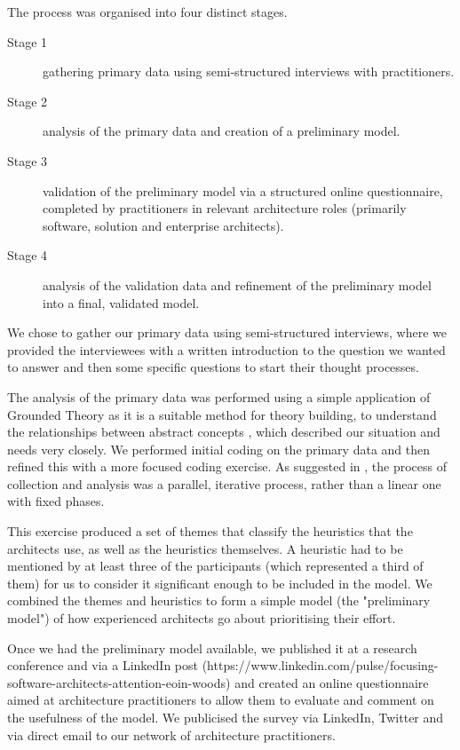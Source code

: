 The process was organised into four distinct stages.

\begin{description}
	\item [Stage 1] gathering primary data using semi-structured interviews with practitioners.
	\item [Stage 2] analysis of the primary data and creation of a preliminary model.
	\item [Stage 3] validation of the preliminary model via a structured online questionnaire, completed by practitioners in relevant architecture roles (primarily software, solution and enterprise architects).
	\item [Stage 4] analysis of the validation data and refinement of the preliminary model into a final, validated model.
\end{description}

We chose to gather our primary data using semi-structured interviews, where we provided the interviewees with a written introduction to the question we wanted to answer and then some specific questions to start their thought processes. 

The analysis of the primary data was performed using a simple application of Grounded Theory as it is a suitable method for theory building, to understand the relationships between abstract concepts \cite{charmaz2006-groundedtheory}, which described our situation and needs very closely.  We performed initial coding on the primary data and then refined this with a more focused coding exercise.  As suggested in \cite{lapan2012-qualitativeresearch}, the process of collection and analysis was a parallel, iterative process, rather than a linear one with fixed phases.  

This exercise produced a set of themes that classify the heuristics that the architects use, as well as the heuristics themselves.  A heuristic had to be mentioned by at least three of the participants (which represented a third of them) for us to consider it significant enough to be included in the model.  We combined the themes and heuristics to form a simple model (the "preliminary model") of how experienced architects go about prioritising their effort. 

Once we had the preliminary model available, we published it at a research conference \cite{woods2017-archpriorisation} and via a LinkedIn post (https://www.linkedin.com/pulse/focusing-software-architects-attention-eoin-woods) and created an online questionnaire \cite{gillham2000-questionnaire} aimed at architecture practitioners to allow them to evaluate and comment on the usefulness of the model.  We publicised the survey via LinkedIn, Twitter and via direct email to our network of architecture practitioners.

